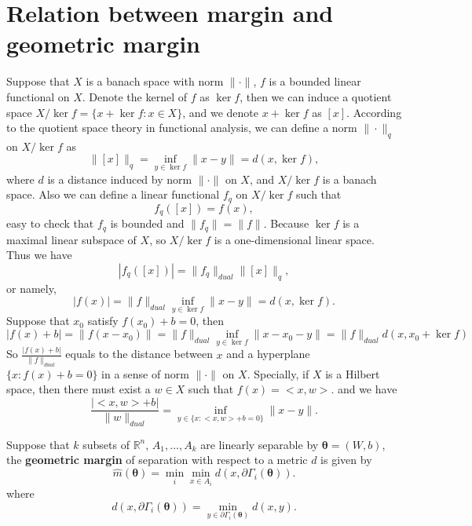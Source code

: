 \section{Relation between margin and geometric margin}
Suppose that $X$ is a banach space with norm $\|\cdot\|$, $f$ is a bounded linear functional on $X$. Denote the kernel of $f$ as $\ker f$, then we can induce a quotient space $X/\ker f = \{x + \ker f : x\in X\}$, and we denote $x+\ker f $ as $[x]$. According to the quotient space theory in functional analysis, we can define a norm $\|\cdot\|_q$ on $X/\ker f$ as
\begin{equation}
	\|[x]\|_q = \inf_{y\in \ker f} \|x-y\| = d(x, \ker f),
\end{equation}
where $d$ is a distance induced by norm $\|\cdot\|$ on $X$, and $X/\ker f$ is a banach space. Also we can define a linear functional $f_q$ on $X/\ker f$ such that
\begin{equation}
	f_q([x]) = f(x),
\end{equation}
easy to check that $f_q$ is bounded and $\|f_q\| = \|f\|$. Because $\ker f$ is a maximal linear subspace of $X$, so $X/\ker f$ is a one-dimensional linear space. Thus we have
\begin{equation}
	|f_q([x])| = \|f_q\|_{dual} \|[x]\|_q,
\end{equation}
or namely,
\begin{equation}
	|f(x)| = \|f\|_{dual} \inf_{y\in \ker f} \|x-y\| = d(x,\ker f).
\end{equation}
Suppose that $x_0$ satisfy $f(x_0) + b = 0$, then
\begin{equation}
	|f(x) + b| = \|f(x-x_0)\| = \|f\|_{dual} \inf_{y\in \ker f} \|x-x_0-y\| = \|f\|_{dual} d(x, x_0+\ker f)
\end{equation}
So $\frac{|f(x)+b|}{\|f\|_{dual}}$ equals to the distance between $x$ and a hyperplane $\{x: f(x) + b = 0\}$ in a sense of norm $\|\cdot\|$ on $X$. Specially, if $X$ is a Hilbert space, then there must exist a $w \in X$ such that $f(x) = <x,w>$. and we have
\begin{equation}
	\frac{|<x,w>+b|}{\|w\|_{dual}} = \inf_{y\in\{x: <x,w> + b = 0\}} \|x-y\|.
\end{equation}

\begin{definition}
	Suppose that $k$ subsets of $\mathbb{R}^n$, $A_1,...,A_k$ are linearly separable by $\bm\theta = (W,b)$,
	the \textbf{geometric margin} of separation with respect to a metric 
	$d$ is given by
	\begin{equation}
	\widehat{m}(\bm\theta) = \min_{i} \min_{x\in A_i} d(x,\partial\Gamma_i(\bm\theta)).
	\end{equation}
	where 
	\begin{equation}
	d(x,\partial\Gamma_i(\bm\theta)) = \min_{y\in \partial\Gamma_i(\bm\theta) } d(x,y).
	\end{equation}
\end{definition}

